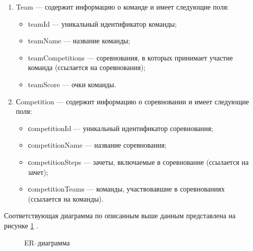 \begin{enumerate}
	\item Team --- содержит информацию о команде и имеет следующие поля:
	\begin{itemize}[label=---]
		\item teamId --- уникальный идентификатор команды;
		\item teamName --- название команды;
		\item teamCompetitions --- соревнования, в которых принимает участие команда (ссылается на соревнования);
		\item teamScore --- очки команды.
	\end{itemize}
		
	\item Сompetition --- содержит информацию о соревновании и имеет следующие поля:
	\begin{itemize}[label=---]
		\item сompetitionId --- уникальный идентификатор соревнования;
		\item сompetitionName --- название соревнования;
		\item сompetitionSteps ---  зачеты, включаемые в соревнование (ссылается на зачет);
		\item сompetitionTeams --- команды, участвовавшие в соревнованиях (ссылается на команды). 
	\end{itemize}	
\end{enumerate}

Соответствующая диаграмма по описанным выше данным представлена на рисунке \ref{fig:er} .

\begin{figure}[ht!]
	\caption{ER--диаграмма}
	\label{fig:er}
\end{figure}

